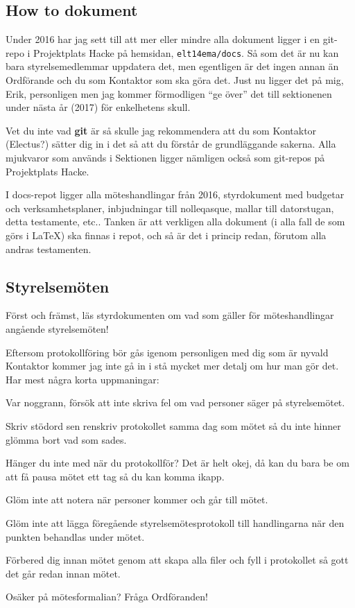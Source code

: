 \documentclass[10pt]{article}
\begin{document}
\subsection{How to dokument}
Under 2016 har jag sett till att mer eller mindre alla dokument ligger i en git-repo i Projektplats Hacke på hemsidan, \texttt{elt14ema/docs}. Så som det är nu kan bara styrelsemedlemmar uppdatera det, men egentligen är det ingen annan än Ordförande och du som Kontaktor som ska göra det. Just nu ligger det på mig, Erik, personligen men jag kommer förmodligen ``ge över'' det till sektionenen under nästa år (2017) för enkelhetens skull.

Vet du inte vad \textbf{git} är så skulle jag rekommendera att du som Kontaktor (Electus?) sätter dig in i det så att du förstår de grundläggande sakerna. Alla mjukvaror som används i Sektionen ligger nämligen också som git-repos på Projektplats Hacke.

I docs-repot ligger alla möteshandlingar från 2016, styrdokument med budgetar och verksamhetsplaner, inbjudningar till nolleqasque, mallar till datorstugan, detta testamente, etc.. Tanken är att verkligen alla dokument (i alla fall de som görs i \LaTeX) ska finnas i repot, och så är det i princip redan, förutom alla andras testamenten.

\subsection{Styrelsemöten}
Först och främst, läs styrdokumenten om vad som gäller för möteshandlingar angående styrelsemöten!

Eftersom protokollföring bör gås igenom personligen med dig som är nyvald Kontaktor kommer jag inte gå in i stå mycket mer detalj om hur man gör det. Har mest några korta uppmaningar:
\begin{tightdashlist}
    \item Var noggrann, försök att inte skriva fel om vad personer säger på styrelsemötet.
    \item Skriv stödord sen renskriv protokollet samma dag som mötet så du inte hinner glömma bort vad som sades.
    \item Hänger du inte med när du protokollför? Det är helt okej, då kan du bara be om att få pausa mötet ett tag så du kan komma ikapp.
    \item Glöm inte att notera när personer kommer och går till mötet.
    \item Glöm inte att lägga föregående styrelsemötesprotokoll till handlingarna när den punkten behandlas under mötet.
    \item Förbered dig innan mötet genom att skapa alla filer och fyll i protokollet så gott det går redan innan mötet.
    \item Osäker på mötesformalian? Fråga Ordföranden!
\end{tightdashlist}
\end{document}
